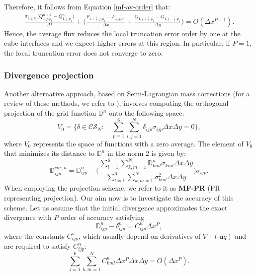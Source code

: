 Therefore, it follows from Equation \eqref{mf-av-order} that:
\begin{align*}
	\frac{\sigma_{1,j,p_1} \big(Q_{1,j,p_1}^{n+1}- Q_{1,j,p_1}^n\big)}{\Delta t} +
	\bigg(
	\frac{F_{1+\frac{1}{2},j,p_1}-F_{\frac{1}{2},j,p_1}}{\Delta x}+
	\frac{G_{1,j+\frac{1}{2},p_1}-G_{1,j-\frac{1}{2},p_1}}{\Delta y} \bigg)
	= O(\Delta x^{P-1}).
\end{align*}
Hence, the average flux reduces the local truncation
error order by one at the cube interfaces and we expect higher errors at this region.
In particular, if $P=1$, the local truncation error does not converge to zero.
\subsubsection{Divergence projection}
\label{mf-pr}
Another alternative approach, based on Semi-Lagrangian mass corrections
(for a review of these methods, we refer to \citet{diamantakis:2014}),
involves computing the orthogonal projection of the grid function $\mathbb{D}^n$ onto the following space:
\begin{equation*}
	V_0 = \{ \delta \in \mathcal{CS}_N: \quad
		\sum_{p=1}^6 \sum_{i,j=1}^N \mathbb{\delta}_{ijp} \sigma_{ijp} \Delta x \Delta y = 0\},
\end{equation*}
where $V_0$ represents the space of functions with a zero average.
The element of $V_0$ that minimizes its distance to $\mathbb{D}^n$ in the norm 2 is given by:
\begin{equation}
\label{dcor-eq1}
\mathbb{D}^{cor,n}_{ijp} = \mathbb{D}^n_{ijp} - \bigg(\frac{	\sum_{l=1}^6 \sum_{k,m=1}^N \mathbb{D}_{kml}^n \sigma_{kml} \Delta x \Delta y}
 {\sum_{l=1}^6 \sum_{k,m=1}^N \sigma_{kml}^2 \Delta x \Delta y}\bigg)\sigma_{ijp}.
\end{equation}
When employing the projection scheme, we refer to it as \textbf{MF-PR} (PR representing projection).
Our aim now is to investigate the accuracy of this scheme.
Let us assume that the initial divergence approximates the exact divergence with $P$ order
of accuracy satisfying
\begin{equation}
\label{dcor-eq2}
	\mathbb{D}^n_{ijp} - \mathbb{\delta}^n_{ijp} = C_{ijp}^n\Delta x^P,
\end{equation}
where the constants $C_{ijp}^n$, which usually depend on derivatives of $\nabla \cdot (\boldsymbol{u}q)$
and are required to satisfy $C_{ijp}^n$:
\begin{equation}
	\label{dcor-eq3}
	\sum_{l=1}^6 \sum_{k,m=1}^N
	{C}^n_{kml} \Delta x^P  {\Delta x \Delta y}  = O(\Delta x^P).
\end{equation}
